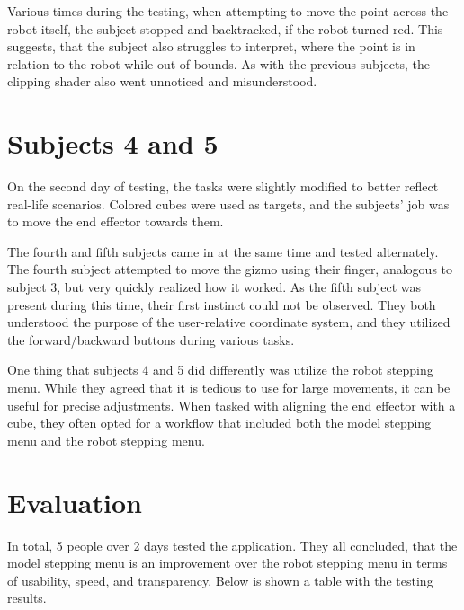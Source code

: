 Various times during the testing, when attempting to move the point across the robot itself, the subject stopped and backtracked, if the robot turned red. This suggests, that the subject also struggles to interpret, where the point is in relation to the robot while out of bounds. As with the previous subjects, the clipping shader also went unnoticed and misunderstood.

\section*{Subjects 4 and 5}

On the second day of testing, the tasks were slightly modified to better reflect real-life scenarios. Colored cubes were used as targets, and the subjects' job was to move the end effector towards them. 

The fourth and fifth subjects came in at the same time and tested alternately. The fourth subject attempted to move the gizmo using their finger, analogous to subject 3, but very quickly realized how it worked.
As the fifth subject was present during this time, their first instinct could not be observed. They both understood the purpose of the user-relative coordinate system, and they utilized the forward/backward buttons during various tasks. 

One thing that subjects 4 and 5 did differently was utilize the robot stepping menu. While they agreed that it is tedious to use for large movements, it can be useful for precise adjustments. When tasked with aligning the end effector with a cube, they often opted for a workflow that included both the model stepping menu and the robot stepping menu.

\section{Evaluation}

In total, 5 people over 2 days tested the application. They all concluded, that the model stepping menu is an improvement over the robot stepping menu in terms of usability, speed, and transparency. Below is shown a table with the testing results. 

